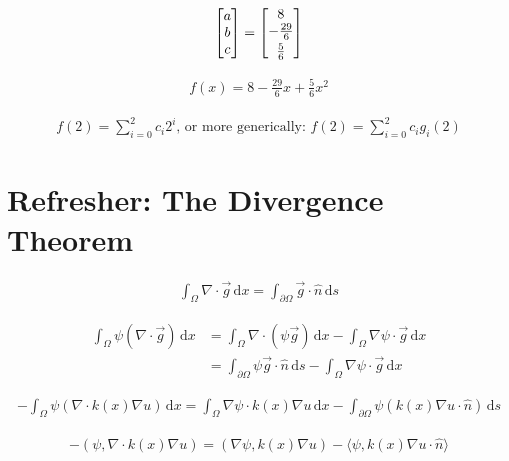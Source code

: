 \documentclass{article}
\begin{document}
	\begin{align*}
		\begin{bmatrix}
			a \\ b \\ c
		\end{bmatrix}
		=
		\begin{bmatrix}
			8 \\ -\frac{29}{6} \vspace{0.25em} \\ \frac{5}{6}
		\end{bmatrix}
	\end{align*}
	
	\begin{align*}
		f(x) = 8 - \frac{29}{6} x + \frac{5}{6} x^2
	\end{align*}
	
	\begin{align*}
		f(2) = \sum_{i=0}^{2} c_i 2^i \text{, or more generically: } f(2) = \sum_{i=0}^{2} c_i g_i(2)
	\end{align*}
	
	\section*{Refresher: The Divergence Theorem}
	
	\begin{align*}
		\int_{\Omega} \nabla \cdot \vec{g} \, \text{d}x = \int_{\partial \Omega} \vec{g} \cdot \hat{n} \, \text{d}s
	\end{align*}
	
	\begin{align*}
		\int_{\Omega} \psi (\nabla \cdot \vec{g}) \, \text{d}x &= \int_{\Omega} \nabla \cdot (\psi \vec{g}) \, \text{d}x - \int_{\Omega} \nabla \psi \cdot \vec{g} \, \text{d}x \\
		&= \int_{\partial \Omega} \psi \vec{g} \cdot \hat{n} \, \text{d}s - \int_{\Omega} \nabla \psi \cdot \vec{g} \, \text{d}x
	\end{align*}
	
	\begin{align*}
		- \int_{\Omega} \psi (\nabla \cdot k(x) \nabla u) \, \text{d}x = \int_{\Omega} \nabla \psi \cdot k(x) \nabla u \, \text{d}x - \int_{\partial \Omega} \psi (k(x) \nabla u \cdot \hat{n}) \, \text{d}s
	\end{align*}
	
	\begin{align*}
		-(\psi , \nabla \cdot k(x) \nabla u) = (\nabla \psi ,  k(x) \nabla u) - \langle \psi , k(x) \nabla u \cdot \hat{n} \rangle
	\end{align*}
	
\end{document}
